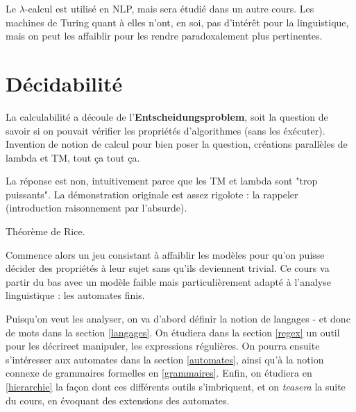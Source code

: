 Le $\lambda$-calcul est utilisé en NLP, mais sera étudié dans un autre cours. Les machines de Turing quant à elles n'ont, en soi, pas d'intérêt pour la linguistique, mais on peut les affaiblir pour les rendre paradoxalement plus pertinentes.

\section{Décidabilité}

La calculabilité a découle de l'\textbf{Entscheidungsproblem}, soit la question de savoir si on pouvait vérifier les propriétés d'algorithmes (sans les éxécuter). Invention de notion de calcul pour bien poser la question, créations parallèles de lambda et TM, tout ça tout ça.

La réponse est non, intuitivement parce que les TM et lambda sont "trop puissants". La démonstration originale est assez rigolote : la rappeler (introduction raisonnement par l'absurde).

Théorème de Rice.

Commence alors un jeu consistant à affaiblir les modèles pour qu'on puisse décider des propriétés à leur sujet sans qu'ils deviennent trivial. Ce cours va partir du bas avec un modèle faible mais particulièrement adapté à l'analyse linguistique : les automates finis. %

Puisqu'on veut les analyser, on va d'abord définir la notion de langages - et donc de mots dans la section \ref{langages}. On étudiera dans la section \ref{regex} un outil pour les décrireet manipuler, les expressions régulières. On pourra ensuite s'intéresser aux automates dans la section \ref{automates}, ainsi qu'à la notion connexe de grammaires formelles en \ref{grammaires}. Enfin, on étudiera en \ref{hierarchie} la façon dont ces différents outils s'imbriquent, et on \textit{teasera} la suite du cours, en évoquant des extensions des automates.
